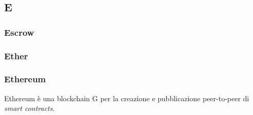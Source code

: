 \subsection*{\textbf{\hfill \Huge{E} \hfill}} 
\subsubsection*{Escrow}

\subsubsection*{Ether}

\subsubsection*{Ethereum}
Ethereum è una blockchain G per la creazione e pubblicazione peer-to-peer di  \textit{smart contracts}\glos .
